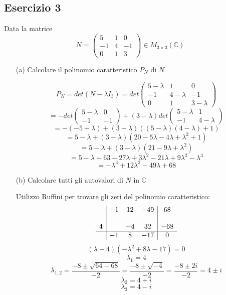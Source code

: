 \documentclass[a4paper]{article}
\theoremstyle{break}
\theoremstyle{break}
\theoremstyle{break}
\theoremstyle{break}
\begin{document}
\subsection{Esercizio 3}
Data la matrice
\[
	N = \begin{pmatrix}
		5  & 1 & 0  \\
		-1 & 4 & -1 \\
		0  & 1 & 3
	\end{pmatrix}
	\in M_{3 \times 3}(\mathbb{C})
\]

\begin{enumerate}
	\item[(a)] Calcolare il polinomio caratteristico \( P_N \) di \( N \)

	      \vspace{1em}
	      \[
		      P_N = det(N - \lambda I_3) = det \begin{pmatrix}
			      5 - \lambda & 1           & 0           \\
			      -1          & 4 - \lambda & -1          \\
			      0           & 1           & 3 - \lambda
		      \end{pmatrix}
	      \]
	      \[
		      = - det \begin{pmatrix}
			      5 - \lambda & 0  \\
			      -1          & -1
		      \end{pmatrix}
		      + (3-\lambda) det \begin{pmatrix}
			      5 - \lambda & 1           \\
			      -1          & 4 - \lambda
		      \end{pmatrix}
	      \]
	      \[
		      = -(-5+\lambda) + (3-\lambda)((5-\lambda)(4-\lambda) + 1)
	      \]
	      \[
		      = 5 - \lambda + (3 - \lambda) (20 - 5 \lambda - 4 \lambda + \lambda^2 + 1)
	      \]
	      \[
		      = 5 - \lambda + (3 - \lambda) (21 - 9 \lambda + \lambda^2)
	      \]
	      \[
		      = 5 - \lambda + 63 - 27 \lambda + 3 \lambda^2 - 21 \lambda + 9 \lambda^2 - \lambda^3
	      \]
	      \[
		      = -\lambda^3 + 12 \lambda^2 - 49 \lambda + 68
	      \]

	\item[(b)] Calcolare tutti gli autovalori di \( N \) in \( \mathbb{C} \)

	      \vspace{1em}
	      Utilizzo Ruffini per trovare gli zeri del polinomio caratteristico:
	      \[
		      \begin{array}{c|ccc|c}
			        & -1 & 12 & -49 & 68  \\
              & & & & \\
			      4 &    & -4 & 32  & -68 \\
			      \hline
			        & -1 & 8  & -17 & 0
		      \end{array}
	      \]
	      \[
		      (\lambda-4)(-\lambda^2 + 8\lambda - 17) = 0
	      \]
	      \[
		      \lambda_1 = 4
	      \]
	      \[
		      \lambda_{1,2} = \frac{-8 \pm \sqrt{64 - 68}}{-2} = \frac{-8 \pm \sqrt{-4}}{-2} = \frac{-8 \pm 2i}{-2} = 4 \pm i
	      \]
	      \[
		      \lambda_2 = 4 + i
	      \]
	      \[
		      \lambda_3 = 4 - i
	      \]


\end{enumerate}
\end{document}
